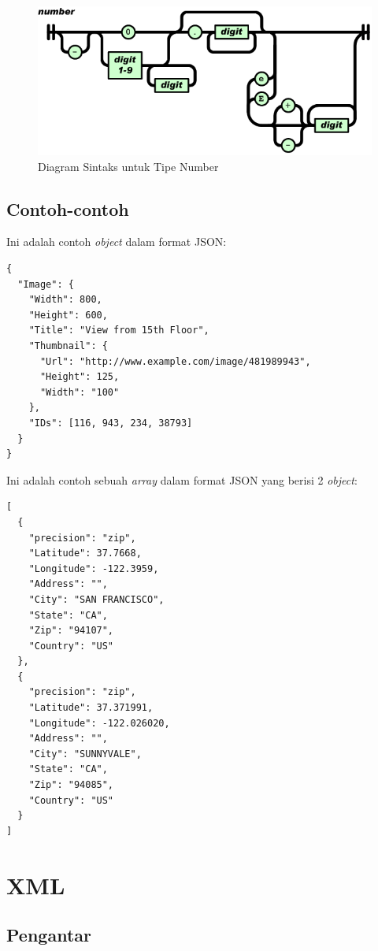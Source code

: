 \documentclass[a4paper, 12pt, oneside]{report}
\begin{document}
\begin{figure}[htp]
\centering
\includegraphics[scale=0.55]{images/number-json.png}
\caption{Diagram Sintaks untuk Tipe Number \cite{json-fat-free}}
\label{Diagram Sintaks untuk Tipe Number}
\end{figure}

\newpage
\subsection{Contoh-contoh}
\onehalfspacing Ini adalah contoh \textit{object} dalam format JSON:

\begin{lstlisting}[frame=single]
{
  "Image": {
    "Width": 800,
    "Height": 600,
    "Title": "View from 15th Floor",
    "Thumbnail": {
      "Url": "http://www.example.com/image/481989943",
      "Height": 125,
      "Width": "100"
    },
    "IDs": [116, 943, 234, 38793]
  }
}
\end{lstlisting}

\onehalfspacing Ini adalah contoh sebuah \textit{array} dalam format JSON yang berisi 2 \textit{object}:

\begin{lstlisting}[frame=single]
[
  {
    "precision": "zip",
    "Latitude": 37.7668,
    "Longitude": -122.3959,
    "Address": "",
    "City": "SAN FRANCISCO",
    "State": "CA",
    "Zip": "94107",
    "Country": "US"
  },
  {
    "precision": "zip",
    "Latitude": 37.371991,
    "Longitude": -122.026020,
    "Address": "",
    "City": "SUNNYVALE",
    "State": "CA",
    "Zip": "94085",
    "Country": "US"
  }
]
\end{lstlisting}

\section{XML}

\subsection{Pengantar}
\end{document}
